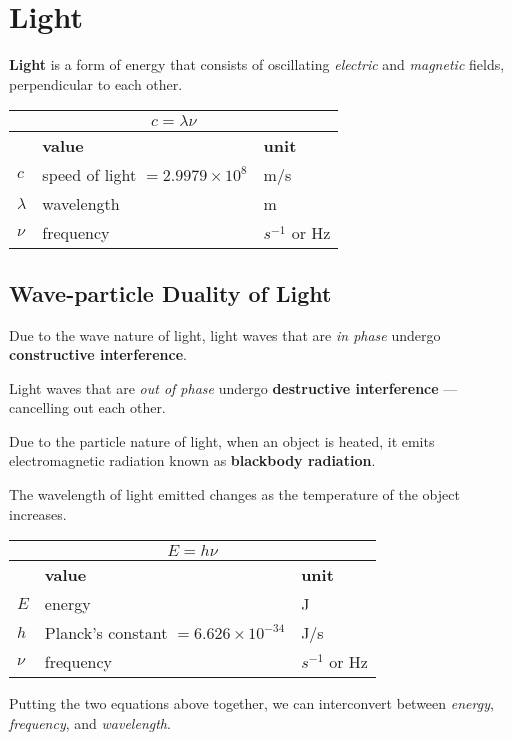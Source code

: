 \section{Light}
\textbf{Light} is a form of energy that consists of oscillating \emph{electric} and \emph{magnetic}
fields, perpendicular to each other.

\begin{tabularx}{\linewidth}{|l|X|l|} \hline
    \multicolumn{3}{|c|}{$c = \lambda \nu$} \\ \hline
    & \textbf{value} & \textbf{unit} \\ \hline
    $c$ & speed of light $= 2.9979 \times 10^8$ & m/s \\ \hdashline
    $\lambda$ & wavelength & m \\
    $\nu$ & frequency & $s^{-1}$ or Hz \\ \hline
\end{tabularx}

\subsection{Wave-particle Duality of Light}

Due to the wave nature of light, light waves that are \textit{in phase} undergo 
\textbf{constructive interference}.

Light waves that are \textit{out of phase} undergo \textbf{destructive interference} 
--- cancelling out each other.

Due to the particle nature of light, when an object is heated, 
it emits electromagnetic radiation known as \textbf{blackbody radiation}.

The wavelength of light emitted changes as the temperature of the object increases.

\begin{tabularx}{\linewidth}{|l|X|l|} \hline
    \multicolumn{3}{|c|}{$E = h \nu$} \\ \hline
    & \textbf{value} & \textbf{unit} \\ \hline
    $E$ & energy & J \\ \hdashline
    $h$ & Planck's constant $= 6.626 \times 10^{-34}$& J/s \\
    $\nu$ & frequency & $s^{-1}$ or Hz \\ \hline
\end{tabularx}

Putting the two equations above together, we can interconvert between \textit{energy}, 
\textit{frequency}, and \textit{wavelength}.


